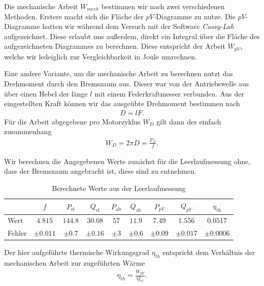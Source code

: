 Die mechanische Arbeit $W_{mech}$ bestimmen wir nach zwei verschiedenen Methoden. Erstere macht sich die Fläche der $pV$-Diagramme zu nutze. Die $pV$-Diagramme hatten wir während dem Versuch mit der Software \textit{Cassy-Lab} aufgezeichnet. Diese erlaubt uns außerdem, direkt ein Integral über die Fläche des aufgezeichneten Diagrammes zu berechnen. Diese entspricht der Arbeit $W_{pV}$, welche wir ledeiglich zur Vergleichbarkeit in Joule umrechnen.

Eine andere Variante, um die mechanische Arbeit zu berechnen nutzt das Drehmoment durch den Bremszaum aus. Dieser war von der Antriebswelle aus über einen Hebel der länge $l$ mit einem Federkraftmesser verbunden. Aus der eingestellten Kraft können wir das ausgeübte Drehmoment bestimmen nach
\begin{align}
    D = l F.
\end{align}
Für die Arbeit abgegebene pro Motorzyklus $W_D$ gilt dann der einfach zusammenhang
\begin{align}
    W_D = 2 \pi D = \frac{P_D}{f}.
\end{align}

Wir berechnen die Angegebenen Werte zunächst für die Leerlaufmessung ohne, dass der Bremszaum angebracht ist, diese sind  zu entnehmen. 

\begin{table}[h!]
    \centering
    \begin{tabular}{l | c | c | c | c | c | c | c | c}
    \textbf{} & \boldmath$f$ & \boldmath$P_{\text{el}}$ & \boldmath$Q_{\text{el}}$ & \boldmath$P_{\text{ab}}$ & \boldmath$Q_{\text{ab}}$ & \boldmath$P_{pV}$ & \boldmath$Q_{pV}$ & \boldmath$\eta_{\text{th}}$ \\\hline
    Wert & $4.815$ & $144.8$ & $30.08$ & $57$ & $11.9$ & $7.49$ & $1.556$ & $0.0517$ \\\hline
    Fehler & $\pm 0.011$ & $\pm 0.7$ & $\pm 0.16$ & $\pm 3$ & $\pm 0.6$ & $\pm 0.09$ & $\pm 0.017$ & $\pm 0.0006$ \\
    \end{tabular}
    \caption{Berechnete Werte aus der Leerlaufmessung}
    \label{tab:werte_leerlauf}
\end{table}

Der hier aufgeführte thermische Wirkungsgrad $\eta_{th}$ entspricht dem Verhältnis der mechanischen Arbeit zur zugeführten Wärme
\begin{align}
    \eta_{th} = \frac{W_{pV}}{Q_{el}}.
\end{align}

